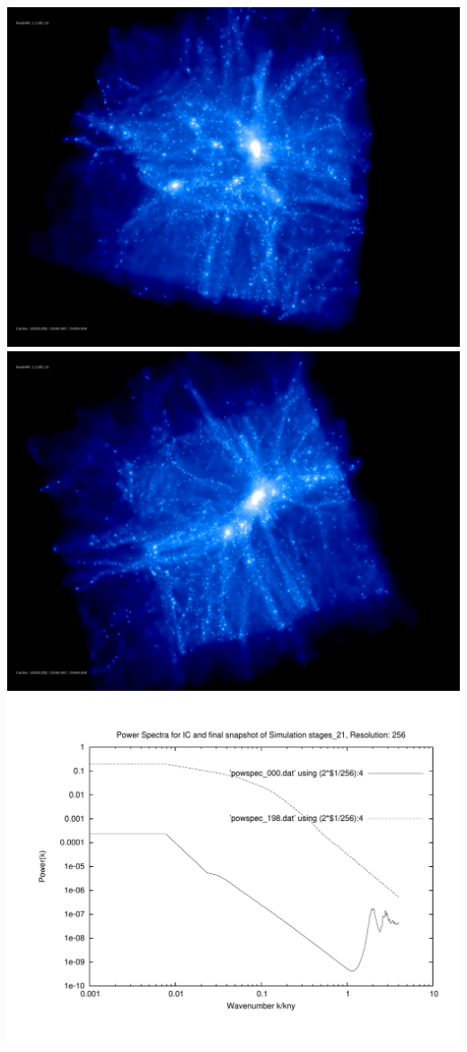 \includegraphics[scale=0.1]{r256/stages_21/rotate_00074.jpg} 
\includegraphics[scale=0.1]{r256/stages_21/rotate_00131.jpg}  \\

\includegraphics[scale=0.5]{r256/stages_21/plot_powspec_stages_21}

